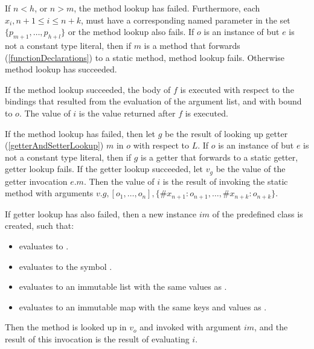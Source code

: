 \documentclass{article}
\begin{document}
\LMHash{}
If $n < h$, or $n > m$, the method lookup has failed.
Furthermore, each $x_i, n+1 \le i \le n+k$, must have a corresponding named parameter in the set $\{p_{m+1}, \ldots, p_{h+l}\}$ or the method lookup also fails.
If $o$ is an instance of  but $e$ is not a constant type literal, then if $m$ is a method that forwards (\ref{functionDeclarations}) to a static method, method lookup fails.
Otherwise method lookup has succeeded.

\LMHash{}
If the method lookup succeeded, the body of $f$ is executed with respect to the bindings that resulted from the evaluation of the argument list, and with \THIS{} bound to $o$.
The value of $i$ is the value returned after $f$ is executed.

\LMHash{}
If the method lookup has failed, then let $g$ be the result of looking up getter (\ref{getterAndSetterLookup}) $m$ in $o$ with respect to $L$.
If $o$ is an instance of  but $e$ is not a constant type literal, then if $g$ is a getter that forwards to a static getter, getter lookup fails.
If the getter lookup succeeded, let $v_g$ be the value of the getter invocation $e.m$.
Then the value of $i$ is the result of invoking the static method  with arguments $v.g, [o_1, \ldots , o_n], \{\#x_{n+1}: o_{n+1}, \ldots , \#x_{n+k}: o_{n+k}\}$.

\LMHash{}
If getter lookup has also failed, then a new instance $im$ of the predefined class  is created, such that:
\begin{itemize}
\item {} evaluates to \code{\TRUE{}}.
\item {} evaluates to the symbol .
\item {} evaluates to an immutable list with the same values as \code{[$o_1, \ldots, o_n$]}.
\item {} evaluates to an immutable map with the same keys and values as .
\end{itemize}

\LMHash{}
Then the method  is looked up in $v_o$ and invoked with argument $im$, and the result of this invocation is the result of evaluating $i$.

\end{document}
